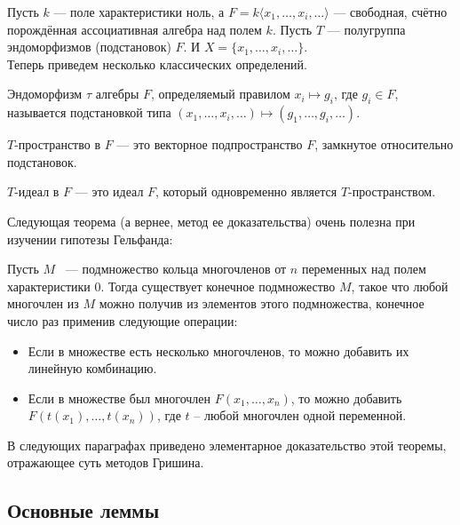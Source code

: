Пусть $k$ — поле характеристики ноль, а $F = k\langle x_1, \ldots, x_i, \ldots \rangle$ — свободная, счётно порождённая ассоциативная алгебра над полем $k$.
Пусть $T$ — полугруппа эндоморфизмов (подстановок) $F$.
И $X = \{ x_1, \ldots, x_i, \ldots \}$.\\
Теперь приведем несколько классических определений.

\vskip 0.1in\noindent
\begin{definition}
    Эндоморфизм $\tau$ алгебры $F$, определяемый правилом $x_i \mapsto g_i$, где $g_i \in F$, называется подстановкой типа $(x_1, \ldots, x_i, \ldots) \mapsto (g_1, \ldots, g_i, \ldots)$.
\end{definition}
\vskip 0.1in\noindent

\vskip 0.1in\noindent
\begin{definition}
    $T$-пространство в $F$ — это векторное подпространство $F$, замкнутое относительно подстановок.
\end{definition}
\vskip 0.1in\noindent

\vskip 0.1in\noindent
\begin{definition}
    $T$-идеал в $F$ — это идеал $F$, который одновременно является $T$-пространством.
\end{definition}
\vskip 0.1in\noindent

Следующая теорема (а вернее, метод ее доказательства) очень полезна при изучении гипотезы Гельфанда:
\vskip 0.1in\noindent
\begin{theorem}
    \label{main}
    Пусть $M$ ~--- подмножество кольца многочленов от $n$ переменных над полем характеристики 0.
    Тогда существует конечное подмножество $M$, такое что любой многочлен из $M$ можно получив из элементов этого подмножества, конечное число раз применив следующие операции:
    \begin{itemize}
        \item Если в множестве есть несколько многочленов, то можно добавить их линейную комбинацию.
        \item Если в множестве был многочлен $F(x_1,\ldots,x_n)$, то можно добавить $F(t(x_1),\ldots,t(x_n))$, где $t$ -- любой многочлен одной переменной.
    \end{itemize}
\end{theorem}
\vskip 0.1in\noindent
В следующих параграфах приведено элементарное доказательство этой теоремы, отражающее суть методов Гришина.

\subsection{Основные леммы}\label{subsec:grishin-main-lemmas}

